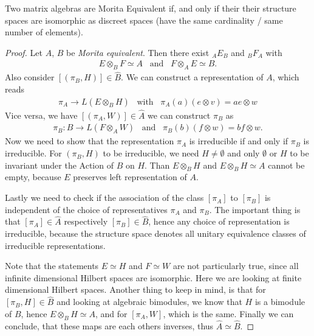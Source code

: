 \begin{theorem}
    Two matrix algebras are Morita Equivalent if, and only if their their structure spaces
    are isomorphic as discreet spaces (have the same cardinality / same number
    of elements).
\end{theorem}
\begin{proof}
    Let $A$, $B$ be \textit{Morita equivalent}. Then there exist $_A E_B$ and $_B F_A$ with
    \begin{align}
        E \otimes _B F \simeq A \;\;\; \text{and} \;\;\; F \otimes _A E \simeq
        B.
    \end{align}
    Also consider $[(\pi _B, H)] \in \hat{B}$. We can construct a
    representation of $A$, which reads
    \begin{align}
        \pi _A \rightarrow L(E \otimes _B H)\;\;\; \text{with} \;\;\; \pi _A(a)
        (e \otimes v) = a e \otimes w
    \end{align}
    Vice versa, we have $[(\pi _A, W)] \in \hat{A}$ we can construct $\pi _B$
    as
    \begin{align}
        \pi _B: B \rightarrow L(F \otimes _A W) \;\;\; \text{and}\;\;\; \pi
        _B(b) (f\otimes w) = bf\otimes w.
    \end{align}
    Now we need to show that the representation $\pi _A$ is irreducible if and
    only if $\pi _B$ is irreducible. For $(\pi _B, H)$ to be irreducible, we
    need $H \neq \emptyset$ and only $\emptyset$ or $H$ to be invariant under
    the Action of $B$ on $H$. Than $E\otimes _B H$ and $E\otimes _B H \simeq A$
    cannot be empty, because $E$ preserves left representation of $A$.

    Lastly we need to check if the association of the class $[\pi _A]$ to $[\pi
    _B]$ is independent of the choice of representatives $\pi _A$ and $\pi _B$.
    The important thing is that $[\pi _A] \in \hat{A}$ respectively $[\pi _B] \in
    \hat{B}$, hence any choice of representation is irreducible, because the
    structure space denotes all unitary equivalence classes of irreducible
    representations.

    Note that the statements $E \simeq H$ and $F \simeq W$ are not particularly
    true, since all infinite dimensional Hilbert spaces are isomorphic.  Here
    we are looking at finite dimensional Hilbert spaces. Another thing to keep
    in mind, is that for $[\pi _B, H] \in \hat{B}$ and looking at algebraic
    bimodules, we know that $H$ is a bimodule of $B$, hence $E \otimes _B
    H\simeq A$, and for $[\pi _A, W]$, which is the same.
    Finally we can conclude, that these maps are each others inverses, thus
    $\hat{A} \simeq \hat{B}$.
\end{proof}

